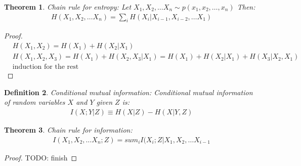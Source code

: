 \documentclass[11pt]{book}
\newtheorem{theorem}{Theorem}
\newtheorem{definition}[theorem]{Definition}
\renewcommand{\H}{\ensuremath{H}}
\newcommand{\I}{\ensuremath{I}}
\begin{document}
\begin{theorem}
    Chain rule for entropy: Let $X_1, X_2, \dots X_n \sim p(x_1, x_2, \dots, x_n)$
    Then:
    \begin{align*}
        \H(X_1, X_2, \dots X_n) = \sum_i \H(X_i | X_{i-1}, X_{i-2}, \dots X_1)
    \end{align*}
\end{theorem}
\begin{proof}
    \begin{align*}
    &\H(X_1, X_2) = \H(X_1) + \H(X_2 | X_1) \\
    &\H(X_1, X_2, X_3) = \H(X_1) + \H(X_2, X_3 | X_1) = \H(X_1) + H(X_2 | X_1) + H(X_3 | X_2, X_1) \\
    &\text{induction for the rest}
    \end{align*}
\end{proof}

\begin{definition}
    Conditional mutual information: Conditional mutual information of random
    variables $X$ and $Y$ given $Z$ is:
    \begin{align*}
        \I(X; Y | Z) \equiv \H(X|Z) - \H(X|Y, Z)
    \end{align*}
\end{definition}

\begin{theorem}
    Chain rule for information:
    \begin{align*}
        \I(X_1, X_2, \dots X_n ; Z) = sum_i I(X_i ; Z | X_1, X_2, \dots X_{i - 1}
    \end{align*}
\end{theorem}
\begin{proof}
    TODO: finish
\end{proof}
\end{document}
